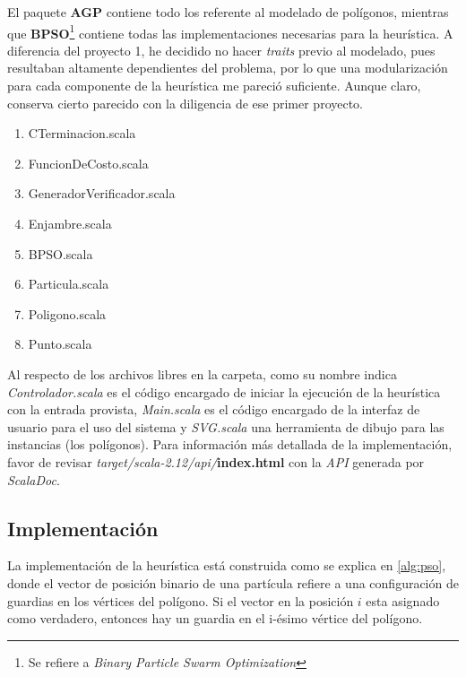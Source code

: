 \documentclass[12pt]{article}
\begin{document}
El paquete \textbf{AGP} contiene todo los referente al modelado de polígonos, mientras que \textbf{BPSO}\footnote{Se refiere a \textit{Binary Particle Swarm Optimization}} contiene todas las implementaciones necesarias para la heurística.
A diferencia del proyecto 1, he decidido no hacer \textit{traits} previo al modelado, pues resultaban
altamente dependientes del problema, por lo que una modularización para cada componente de la heurística me pareció suficiente. Aunque claro, conserva cierto parecido con la diligencia de ese primer proyecto.

\begin{multicols}{2}
\begin{enumerate}
\item CTerminacion.scala
\item FuncionDeCosto.scala
\item GeneradorVerificador.scala
\item Enjambre.scala
\item BPSO.scala
\item Particula.scala

\item Poligono.scala
\item Punto.scala
\end{enumerate}
\end{multicols}

Al respecto de los archivos libres en la carpeta, como su nombre indica \textit{Controlador.scala}
es el código encargado de iniciar la ejecución de la heurística con la entrada provista, \textit{Main.scala} es el código encargado de la interfaz de usuario para el uso del sistema y \textit{SVG.scala}
una herramienta de dibujo para las instancias (los polígonos). 
Para información más detallada de la implementación, favor de revisar
\textit{target/scala-2.12/api/}\textbf{index.html} con la \textit{API} generada por \textit{ScalaDoc}.

\subsection{Implementación}
La implementación de la heurística está construida como se explica en \ref{alg:pso}, donde el vector
de posición binario de una partícula refiere a una configuración de guardias en los vértices del
polígono. Si el vector en la posición $i$ esta asignado como verdadero, entonces hay un guardia
en el i-ésimo vértice del polígono.  
\end{document}
